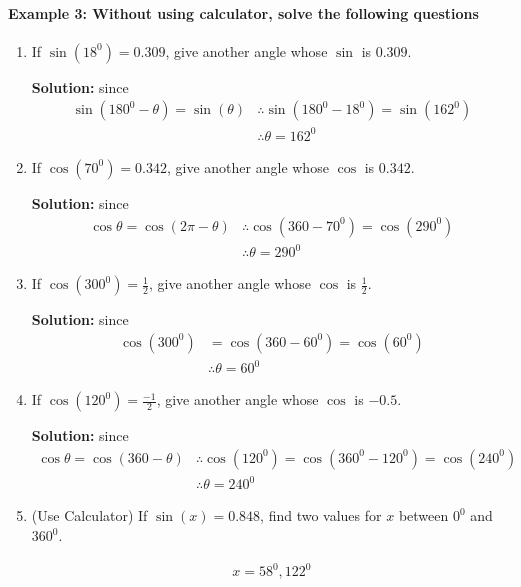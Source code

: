 \documentclass{article}
\begin{document}
\paragraph{Example 3: Without using calculator, solve the following questions}
\begin{enumerate}[label=\alph*)]
  \item If $\sin(18^{0})= 0.309$, give another angle whose $\sin$ is $0.309$.
        
        {\scriptsize \textbf{Solution:} since}
        \[
        \begin{aligned}
          \sin(180^0-\theta) = \sin(\theta)
          &\therefore \sin(180^{0}-18^{0}) = \sin(162^{0}) \\
          &\therefore \theta = 162^{0}
        \end{aligned}
        \]

  \item If $\cos(70^{0})= 0.342$, give another angle whose $\cos$ is $0.342$.

        {\scriptsize \textbf{Solution:} since}
        \[
        \begin{aligned}
          \cos\theta = \cos(2\pi - \theta)
          &\therefore \cos(360-70^{0}) = \cos(290^{0}) \\
          &\therefore \theta = 290^{0}
        \end{aligned}
        \]

  \item If $\cos(300^{0})= \frac{1}{2}$, give another angle whose $\cos$ is $\frac{1}{2}$.

        {\scriptsize \textbf{Solution:} since}
        \[
        \begin{aligned}
          \cos(300^{0}) &= \cos(360-60^{0}) = \cos(60^{0}) \\
                       &\therefore \theta = 60^{0}
        \end{aligned}
        \]

  \item If $\cos(120^{0})= \frac{-1}{2}$, give another angle whose $\cos$ is $-0.5$.

        {\scriptsize \textbf{Solution:} since}
        \[
        \begin{aligned}
          \cos\theta = \cos(360-\theta)
          &\therefore \cos(120^{0}) = \cos(360^{0} - 120^{0}) = \cos(240^{0}) \\
          &\therefore \theta = 240^{0}
        \end{aligned}
        \]

  \item (Use Calculator) If $\sin(x)= 0.848$, find two values for $x$ between $0^{0}$ and $360^{0}$.

        \[
        \begin{aligned}
          x = 58^{0}, 122^{0}
        \end{aligned}
        \]
\end{enumerate}
\end{document}
